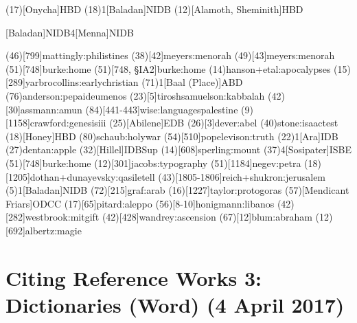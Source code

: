 \documentclass[a4paper]{article}
\begin{document}
\examplecite(17)[Onycha]{HBD}
\examplevolcite(18){1}[Baladan]{NIDB}
\examplecite(12)[Alamoth, Sheminith]{HBD}
\begin{fverbcite}{38}
  [Baladan]{NIDB}{4}[Menna]{NIDB}
\end{fverbcite}
\examplecite(46)[799]{mattingly:philistines}
\examplecite(38)[42]{meyers:menorah}
\examplecite(49)[43]{meyers:menorah}
\examplecite(51)[748]{burke:home}
\examplecite[afull](51)[748, §IA2]{burke:home}
\examplecite(14){hanson+etal:apocalypses}
\examplecite(15)[289]{yarbrocollins:earlychristian}
\examplevolcite(71){1}[Baal \mkbibparens{Place}]{ABD}
\examplecite(76){anderson:pepaideumenos}
\examplecite(23)[5]{tiroshsamuelson:kabbalah}
\examplecite(42)[30]{assmann:amun}
\examplecite(84)[441-443]{wise:languagespalestine}
\examplecite(9)[1158]{crawford:genesisiii}
\examplecite(25)[Abilene]{EDB}
\examplecite(26)[3]{dever:abel}
\examplecite(40){stone:isaactest}
\examplecite(18)[Honey]{HBD}
\examplecite(80){schaub:holywar}
\examplecite(54)[510]{popelevison:truth}
\examplevolcite(22){1}[Ara]{IDB}
\examplecite(27){dentan:apple}
\examplecite(32)[Hillel]{IDBSup}
\examplecite(14)[608]{sperling:mount}
\examplevolcite(37){4}[Sosipater]{ISBE}
\examplecite[afull](51)[748]{burke:home}
\examplecite(12)[301]{jacobs:typography}
\examplecite(51)[1184]{negev:petra}
\examplecite(18)[1205]{dothan+dunayevsky:qasiletell}
\examplecite(43)[1805-1806]{reich+shukron:jerusalem}
\examplevolcite(5){1}[Baladan]{NIDB}
\examplecite(72)[215]{graf:arab}
\examplecite(16)[1227]{taylor:protogoras}
\examplecite(57)[Mendicant Friars]{ODCC}
\examplecite(17)[65]{pitard:aleppo}
\examplecite(56)[8-10]{honigmann:libanos}
\examplecite(42)[282]{westbrook:mitgift}
\examplecite(42)[428]{wandrey:ascension}
\examplecite(67)[12]{blum:abraham}
\examplecite(12)[692]{albertz:magie}
\begin{verbcite}
  \nocite{DLNT, DNTB, DOTHB, DPL, RGG}
\end{verbcite}
\exampleabbreviations
\examplebibliography
{}

\section{Citing Reference Works 3: Dictionaries (Word) (4 April 2017)}
\end{document}
